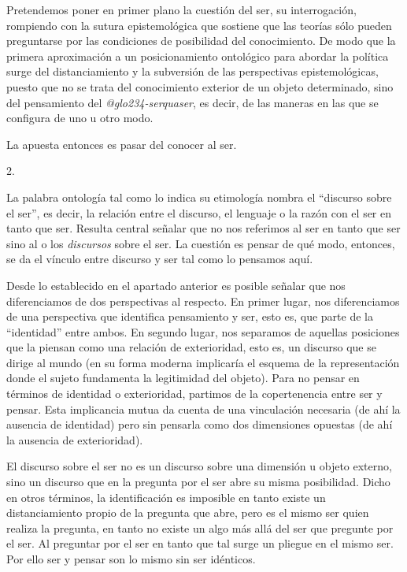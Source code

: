 Pretendemos poner en primer plano la cuestión del ser, su interrogación, rompiendo con la sutura epistemológica que sostiene que las teorías sólo pueden preguntarse por las condiciones de posibilidad del conocimiento. De modo que la primera aproximación a un posicionamiento ontológico para abordar la política surge del distanciamiento y la subversión de las perspectivas epistemológicas, puesto que no se trata del conocimiento exterior de un objeto determinado, sino del pensamiento del \emph{\gls{@glo234-serquaser}}, es decir, de las maneras en las que se configura de uno u otro modo.

La apuesta entonces es pasar del conocer al ser.

2.

La palabra ontología tal como lo indica su etimología nombra el \enquote{discurso sobre el ser}, es decir, la relación entre el discurso, el lenguaje o la razón con el ser en tanto que ser. Resulta central señalar que no nos referimos al ser en tanto que ser  sino al o los \emph{discursos} sobre el ser. La cuestión es pensar de qué modo, entonces, se da el vínculo entre discurso y ser tal como lo pensamos aquí.

Desde lo establecido en el apartado anterior es posible señalar que nos diferenciamos de dos perspectivas al respecto. En primer lugar, nos diferenciamos de una perspectiva que identifica pensamiento y ser, esto es, que parte de la \enquote{identidad} entre ambos. En segundo lugar, nos separamos de aquellas posiciones que la piensan como una relación de exterioridad, esto es, un discurso que se dirige al mundo (en su forma moderna implicaría el esquema de la representación donde el sujeto fundamenta la legitimidad del objeto). Para no pensar en términos de identidad o exterioridad, partimos de la copertenencia entre ser y pensar. Esta implicancia mutua da cuenta de una vinculación necesaria (de ahí la ausencia de identidad) pero sin pensarla como dos dimensiones opuestas (de ahí la ausencia de exterioridad).

El discurso sobre el ser no es un discurso sobre una dimensión u objeto externo, sino un discurso que en la pregunta por el ser abre su misma posibilidad. Dicho en otros términos, la identificación es imposible en tanto existe un distanciamiento propio de la pregunta que abre, pero es el mismo ser quien realiza la pregunta, en tanto no existe un algo más allá del ser que pregunte por el ser. Al preguntar por el ser en tanto que tal surge un pliegue en el mismo ser. Por ello ser y pensar son lo mismo sin ser idénticos.

